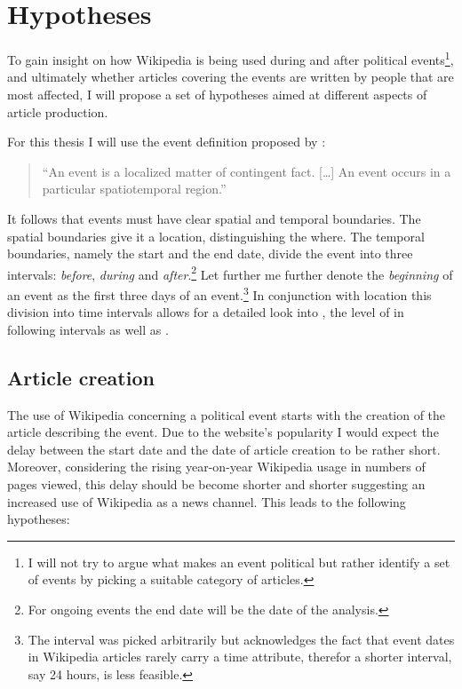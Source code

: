 \chapter{Hypotheses}\label{ch:hypotheses}

To gain insight on how Wikipedia is being used during and after political events\footnote{I will not try to argue what makes an event political but rather identify a set of events by picking a suitable category of articles.}, and ultimately whether articles covering the events are written by people that are most affected, I will propose a set of hypotheses aimed at different aspects of article production.

For this thesis I will use the event definition proposed by \textcite[243]{lewis1987philosophical}: 
\begin{quotation}
``An event is a localized matter of contingent fact. [\ldots] An event occurs in a particular spatiotemporal region.''
\end{quotation}
It follows that events must have clear spatial and temporal boundaries.
The spatial boundaries give it a location, distinguishing the where.
The temporal boundaries, namely the start and the end date, divide the event into three intervals: \emph{before}, \emph{during} and \emph{after}.\footnote{For ongoing events the end date will be the date of the analysis.}
Let further me further denote the \emph{beginning} of an event as the first three days of an event.\footnote{The interval was picked arbitrarily but acknowledges the fact that event dates in Wikipedia articles rarely carry a time attribute, therefor a shorter interval, say 24 hours, is less feasible.}
In conjunction with location this division into time intervals allows for a detailed look into , the level of  in following intervals as well as  .

\section{Article creation}\label{sec:articlecreation}

The use of Wikipedia concerning a political event starts with the creation of the article describing the event.
Due to the website's popularity I would expect the delay between the start date and the date of article creation to be rather short.
Moreover, considering the rising year-on-year Wikipedia usage in numbers of pages viewed\cite{wikipv}, this delay should be become shorter and shorter suggesting an increased use of Wikipedia as a news channel.
This leads to the following hypotheses:

